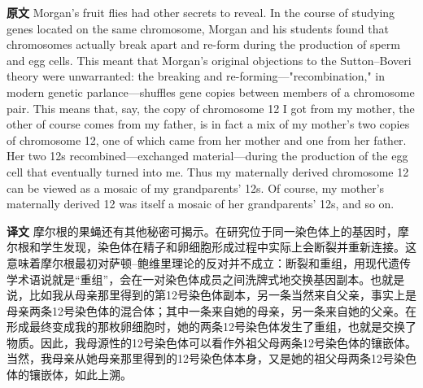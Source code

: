 \documentclass[UTF8,zihao=-4]{ctexart}
\newcommand{\BodyFont}{\fontsize{10.5pt}{15.5pt}\selectfont}
\renewenvironment{quote}{\par\noindent\begingroup\BodyFont}{\par\endgroup}
\begin{document}
\begin{quote}
\noindent\textbf{原文} Morgan's fruit flies had other secrets to reveal. In the course of studying genes located on the same chromosome, Morgan and his students found that chromosomes actually break apart and re-form during the production of sperm and egg cells. This meant that Morgan's original objections to the Sutton--Boveri theory were unwarranted: the breaking and re-forming---"recombination," in modern genetic parlance---shuffles gene copies between members of a chromosome pair. This means that, say, the copy of chromosome 12 I got from my mother, the other of course comes from my father, is in fact a mix of my mother's two copies of chromosome 12, one of which came from her mother and one from her father. Her two 12s recombined---exchanged material---during the production of the egg cell that eventually turned into me. Thus my maternally derived chromosome 12 can be viewed as a mosaic of my grandparents' 12s. Of course, my mother's maternally derived 12 was itself a mosaic of her grandparents' 12s, and so on.

\smallskip
\noindent\textbf{译文} 摩尔根的果蝇还有其他秘密可揭示。在研究位于同一染色体上的基因时，摩尔根和学生发现，染色体在精子和卵细胞形成过程中实际上会断裂并重新连接。这意味着摩尔根最初对萨顿--鲍维里理论的反对并不成立：断裂和重组，用现代遗传学术语说就是“重组”，会在一对染色体成员之间洗牌式地交换基因副本。也就是说，比如我从母亲那里得到的第12号染色体副本，另一条当然来自父亲，事实上是母亲两条12号染色体的混合体；其中一条来自她的母亲，另一条来自她的父亲。在形成最终变成我的那枚卵细胞时，她的两条12号染色体发生了重组，也就是交换了物质。因此，我母源性的12号染色体可以看作外祖父母两条12号染色体的镶嵌体。当然，我母亲从她母亲那里得到的12号染色体本身，又是她的祖父母两条12号染色体的镶嵌体，如此上溯。
\end{quote}
\end{document}
